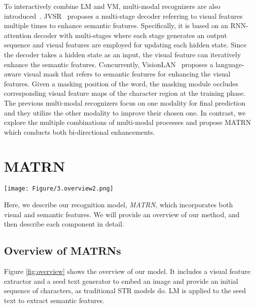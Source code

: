 \documentclass[runningheads]{llncs}
\begin{document}
To interactively combine LM and VM, multi-modal recognizers are also introduced~\cite{JVSR,VisionLAN}.
JVSR~\cite{JVSR} proposes a multi-stage decoder referring to visual features multiple times to enhance semantic features. 
Specifically, it is based on an RNN-attention decoder with multi-stages where each stage generates an output sequence and visual features are employed for updating each hidden state. 
Since the decoder takes a hidden state as an input, the visual feature can iteratively enhance the semantic features.
Concurrently, VisionLAN~\cite{VisionLAN} proposes a language-aware visual mask that refers to semantic features for enhancing the visual features. Given a masking position of the word, the masking module occludes corresponding visual feature maps of the character region at the training phase.
The previous multi-modal recognizers focus on one modality for final prediction and they utilize the other modality to improve their chosen one. In contrast, we explore the multiple combinations of multi-modal processes and propose MATRN which conducts both bi-directional enhancements.

\section{MATRN}

\begin{figure*}[t!]
\centering
\texttt{[image: Figure/3.overview2.png]}
\caption{An overview of MATRN. A visual feature extractor and an LM extract visual and semantic features, respectively. By utilizing the attention map, representing relations between visual features and character positions, MATRNs encode spatial information into the semantic features and hide visual features related to a randomly selected character. Through the multi-modal feature enhancement module, visual and semantic features interact with each other and the enhanced features in the two modalities are fused to finalize the output sequence. }
\label{fig:overview}
\end{figure*}

Here, we describe our recognition model, \emph{MATRN}, which incorporates both visual and semantic features. We will provide an overview of our method, and then describe each component in detail. 

\subsection{Overview of MATRNs}
Figure \ref{fig:overview} shows the overview of our model. It includes a visual feature extractor and a seed text generator to embed an image and provide an initial sequence of characters, as traditional STR models do. LM is applied to the seed text to extract semantic features.
\end{document}
